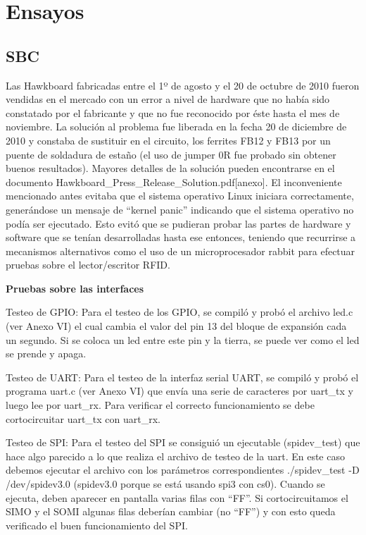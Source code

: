 \chapter{Ensayos}

\section{SBC}
Las Hawkboard fabricadas entre el 1º de agosto y el 20 de octubre de 2010 fueron vendidas en el mercado con 
un error a nivel de hardware que no había sido constatado por el fabricante y que no fue reconocido por éste
hasta el mes de noviembre. La solución al problema fue liberada en la fecha 20 de diciembre de 2010 y constaba de sustituir en el circuito, los ferrites FB12 y FB13 por un puente de soldadura de estaño (el uso de jumper 0R fue probado sin obtener buenos resultados). Mayores detalles de la solución pueden encontrarse en el documento Hawkboard\_Press\_Release\_Solution.pdf[anexo].
El inconveniente mencionado antes evitaba que el sistema operativo Linux iniciara correctamente, generándose un mensaje de “kernel panic” indicando que el sistema operativo no podía ser ejecutado. Esto evitó que se pudieran probar las partes de hardware y software que se tenían desarrolladas hasta ese entonces, teniendo que recurrirse a mecanismos alternativos como el uso de un microprocesador rabbit para efectuar pruebas sobre el lector/escritor RFID.

\bigskip
\bigskip
{\bf{Pruebas sobre las interfaces}}

Testeo de GPIO: Para el testeo de los GPIO, se compiló y probó el archivo led.c (ver Anexo VI) el
cual cambia el valor del pin 13 del bloque de expansión cada un segundo. Si se coloca un led entre
este pin y la tierra, se puede ver como el led se prende y apaga.


Testeo de UART: Para el testeo de la interfaz serial UART, se compiló y probó el programa uart.c
(ver Anexo VI) que envía una serie de caracteres por uart\_tx y luego lee por uart\_rx. Para verificar
el correcto funcionamiento se debe cortocircuitar uart\_tx con uart\_rx.


Testeo de SPI: Para el testeo del SPI se consiguió un ejecutable (spidev\_test) que hace algo parecido
a lo que realiza el archivo de testeo de la uart. En este caso debemos ejecutar el archivo con los
parámetros correspondientes ./spidev\_test -D /dev/spidev3.0 (spidev3.0 porque se está usando spi3
con cs0). Cuando se ejecuta, deben aparecer en pantalla varias filas con “FF”. Si
cortocircuitamos el SIMO y el SOMI algunas filas deberían cambiar (no “FF”) y con esto queda
verificado el buen funcionamiento del SPI.


